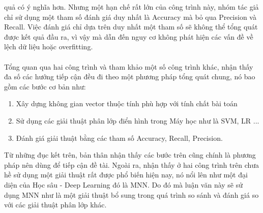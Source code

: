 quả có ý nghĩa hơn. Nhưng một hạn chế rất lớn của công trình này, nhóm tác giả 
chỉ sử dụng một tham số đánh giá duy nhất là Accuracy mà bỏ qua Precision và 
Recall. Việc đánh giá chỉ dựa trên duy nhất một tham số sẽ không thể tổng quát 
được kết quả đầu ra, vì vậy mà dẫn đến nguy cơ không phát hiện các vấn đề về 
lệch dữ liệu hoặc overfitting.\\\\ 
Tổng quan qua hai công trình và tham khảo một số công trình khác, nhận thấy 
đa số các hướng tiếp cận đều đi theo một phương pháp tổng quát chung, nó bao gồm các bước 
cơ bản như:
\begin{enumerate}
\item Xây dựng không gian vector thuộc tính phù hợp với tính chất bài toán
\item Sử dụng các giải thuật phân lớp điển hình trong Máy học như là 
SVM, LR ...
\item Đánh giá giải thuật bằng các tham số Accuracy, Recall, Precision.
\end{enumerate}
Từ những đục kết trên, bản thân nhận thấy các bước trên cũng chính là phương pháp 
nên dùng để tiếp cận đề tài. Ngoài ra, nhận thấy ở hai công trình trên chưa 
hề sử dụng một giải thuật rất được phổ biến hiện nay, nó nổi lên như một đại 
diện của Học sâu - Deep Learning đó là MNN. Do đó mà luận văn này sẽ sử dụng 
MNN như là một giải thuật bổ sung trong quá trình so sánh và đánh giá so với 
các giải thuật phân lớp khác.